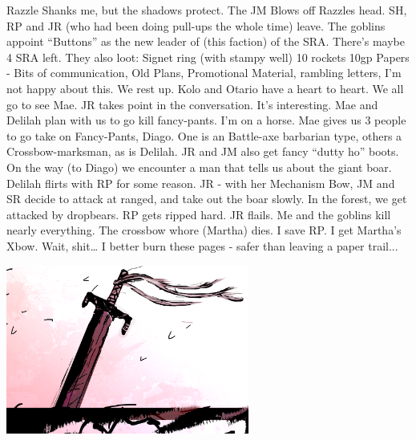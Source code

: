 Razzle Shanks me, but the shadows protect.
The JM Blows off Razzles head.
SH, RP and JR (who had been doing pull-ups the whole time) leave.
The goblins appoint “Buttons” as the new leader of (this faction) of the SRA.
There's maybe 4 SRA left.
They also loot: Signet ring (with stampy well) 10 rockets 10gp
Papers - Bits of communication, Old Plans, Promotional Material, rambling letters,
I’m not happy about this.
We rest up.
Kolo and Otario have a heart to heart.
We all go to see Mae. JR takes point in the conversation. It’s interesting. Mae and Delilah plan with us to go kill fancy-pants.
I’m on a horse.
Mae gives us 3 people to go take on Fancy-Pants, Diago. One is an Battle-axe barbarian type, others a Crossbow-marksman, as is Delilah.
JR and JM also get fancy “dutty ho” boots.
On the way (to Diago) we encounter a man that tells us about the giant boar. Delilah flirts with RP for some reason.
JR - with her Mechanism Bow, JM and SR decide to attack at ranged, and take out the boar slowly.
In the forest, we get attacked by dropbears.
RP gets ripped hard. JR flails.
Me and the goblins kill nearly everything.
The crossbow whore (Martha) dies.
I save RP.
I get Martha’s Xbow.
Wait, shit… I better burn these pages - safer than leaving a paper trail... 
\begin{center}
\includegraphics[width=80mm]{./img/otoriagrave.png}
\begin{figure}[h]
\end{figure}
\end{center}

\clearpage